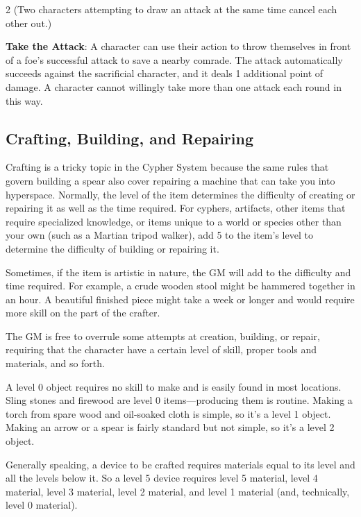 \begin{multicols}{2}
(Two characters attempting to draw an attack at the same time cancel each other out.)

\textbf{Take the Attack}: A character can use their action to throw themselves in front of a foe’s successful attack to save a nearby comrade. The attack automatically succeeds against the sacrificial character, and it deals 1 additional point of damage. A character cannot willingly take more than one attack each round in this way.

\subsection{Crafting, Building, and Repairing}

Crafting is a tricky topic in the Cypher System because the same rules that govern building a spear also cover repairing a machine that can take you into hyperspace. Normally, the level of the item determines the difficulty of creating or repairing it as well as the time required. For cyphers, artifacts, other items that require specialized knowledge, or items unique to a world or species other than your own (such as a Martian tripod walker), add 5 to the item’s level to determine the difficulty of building or repairing it. 

Sometimes, if the item is artistic in nature, the GM will add to the difficulty and time required. For example, a crude wooden stool might be hammered together in an hour. A beautiful finished piece might take a week or longer and would require more skill on the part of the crafter.

The GM is free to overrule some attempts at creation, building, or repair, requiring that the character have a certain level of skill, proper tools and materials, and so forth.

A level 0 object requires no skill to make and is easily found in most locations. Sling stones and firewood are level 0 items—producing them is routine. Making a torch from spare wood and oil-soaked cloth is simple, so it’s a level 1 object. Making an arrow or a spear is fairly standard but not simple, so it’s a level 2 object.

Generally speaking, a device to be crafted requires materials equal to its level and all the levels below it. So a level 5 device requires level 5 material, level 4 material, level 3 material, level 2 material, and level 1 material (and, technically, level 0 material).


\end{multicols}
